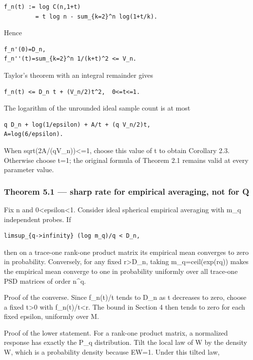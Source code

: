 \documentclass[
  10pt,
]{article}
\begin{document}
\begin{verbatim}
f_n(t) := log C(n,1+t)
         = t log n - sum_{k=2}^n log(1+t/k).
\end{verbatim}

Hence

\begin{verbatim}
f_n'(0)=D_n,
f_n''(t)=sum_{k=2}^n 1/(k+t)^2 <= V_n.
\end{verbatim}

Taylor's theorem with an integral remainder gives

\begin{verbatim}
f_n(t) <= D_n t + (V_n/2)t^2,  0<=t<=1.
\end{verbatim}

The logarithm of the unrounded ideal sample count is at most

\begin{verbatim}
q D_n + log(1/epsilon) + A/t + (q V_n/2)t,
A=log(6/epsilon).
\end{verbatim}

When sqrt(2A/(qV\_n))\textless=1, choose this value of t to obtain
Corollary 2.3. Otherwise choose t=1; the original formula of Theorem 2.1
remains valid at every parameter value.

\subsubsection{Theorem 5.1 --- sharp rate for empirical averaging, not
for Q}\label{theorem-5.1-sharp-rate-for-empirical-averaging-not-for-q}

Fix n and 0\textless epsilon\textless1. Consider ideal spherical
empirical averaging with m\_q independent probes. If

\begin{verbatim}
limsup_{q->infinity} (log m_q)/q < D_n,
\end{verbatim}

then on a trace-one rank-one product matrix its empirical mean converges
to zero in probability. Conversely, for any fixed r\textgreater D\_n,
taking m\_q=ceil(exp(rq)) makes the empirical mean converge to one in
probability uniformly over all trace-one PSD matrices of order n\^{}q.

Proof of the converse. Since f\_n(t)/t tends to D\_n as t decreases to
zero, choose a fixed t\textgreater0 with f\_n(t)/t\textless r. The bound
in Section 4 then tends to zero for each fixed epsilon, uniformly over
M.

Proof of the lower statement. For a rank-one product matrix, a
normalized response has exactly the P\_q distribution. Tilt the local
law of W by the density W, which is a probability density because EW=1.
Under this tilted law,
\end{document}
